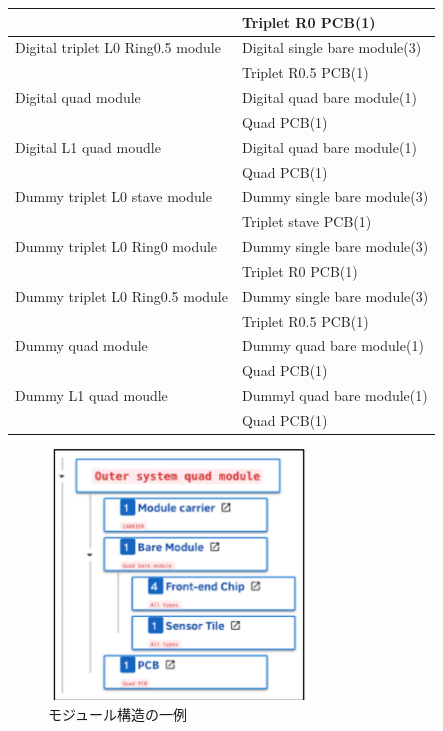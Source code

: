 \begin{table}[tbp]
\begin{center}
\begin{tabular}{|ll|}
                                      &  Triplet R0 PCB(1) \\\hline
    Digital triplet L0 Ring0.5 module &  Digital single bare module(3) \\
                                      &  Triplet R0.5 PCB(1) \\\hline
    Digital quad module       &  Digital quad bare module(1) \\
                              &  Quad PCB(1) \\\hline
    Digital L1 quad moudle    &  Digital quad bare module(1) \\
                              &  Quad PCB(1) \\\hline
    Dummy triplet L0 stave module   &  Dummy single bare module(3) \\
                                    &  Triplet stave PCB(1) \\\hline
    Dummy triplet L0 Ring0 module   &  Dummy single bare module(3) \\
                                    &  Triplet R0 PCB(1) \\\hline
    Dummy triplet L0 Ring0.5 module &  Dummy single bare module(3) \\
                                    &  Triplet R0.5 PCB(1) \\\hline
    Dummy quad module       &  Dummy quad bare module(1) \\
                            &  Quad PCB(1) \\\hline
    Dummy L1 quad moudle    &  Dummyl quad bare module(1) \\
                            &  Quad PCB(1) \\ \hline
  \end{tabular}
\end{center}
\end{table}

\begin{figure}[bpt]\centering
\includegraphics[width=7cm]{example_module_structure}
\caption[モジュール構造の一例]{モジュール構造の一例}
\label{example_module_structure}
\end{figure}

